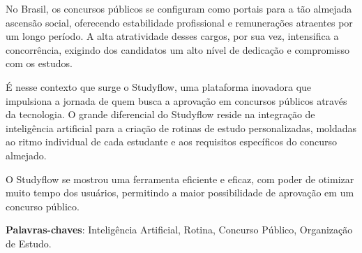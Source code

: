    
\setlength{\absparsep}{18pt} %
\begin{resumo}
  No Brasil, os concursos públicos se configuram como portais para a tão almejada ascensão social, oferecendo estabilidade profissional e remunerações atraentes por um longo período. A alta atratividade desses cargos, por sua vez, intensifica a concorrência, exigindo dos candidatos um alto nível de dedicação e compromisso com os estudos.

    É nesse contexto que surge o Studyflow, uma plataforma inovadora que impulsiona a jornada de quem busca a aprovação em concursos públicos através da tecnologia. O grande diferencial do Studyflow reside na integração de inteligência artificial para a criação de rotinas de estudo personalizadas, moldadas ao ritmo individual de cada estudante e aos requisitos específicos do concurso almejado.

    O Studyflow se mostrou uma ferramenta eficiente e eficaz, com poder de otimizar muito tempo dos usuários, permitindo a maior possibilidade de aprovação em um concurso público.

 \textbf{Palavras-chaves}: Inteligência Artificial, Rotina, Concurso Público, Organização de Estudo.
\end{resumo}

    
    
